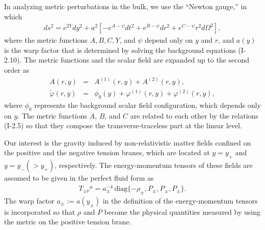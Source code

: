 \documentclass[a4paper,showpacs,preprintnumbers,amsmath,amssymb]{revtex4}
\begin{document}
In analyzing metric perturbations in the bulk, we use the ``Newton gauge,'' in which   
\begin{eqnarray}
 ds^2 
     = e^{2 Y } dy^2 + a^2 
\left[- e^{ A - \psi } dt^2
      + e^{ B - \psi } dr^2
      + e^{ C - \psi } r^2 d\Omega^2 
\right], 
\label{eq:metric}
\end{eqnarray}
where the metric functions $A, B, C, Y$, and $\psi$ depend only on $y$ and $r$, and $a(y)$ is the warp factor that is determined by solving the background equations (I-2.10).
The metric functions and the scalar field are expanded up to the second order as 
\begin{eqnarray}
  A(r,y) &=& A^{(1)}(r,y) +A^{(2)} (r,y) ,
\\
 \tilde\varphi (r, y) 
 &=& \phi_0(y) + \varphi^{(1)}(r,y)+\varphi^{(2)}(r,y) ,
\end{eqnarray}
where $\phi_0$ represents the background scalar field configuration, which depends only on $y$. The metric functions $A$, $B$, and $C$ are related to each other by the relations (I-2.5) so that they compose the transverse-traceless part at the linear level. 


Our interest is the gravity induced by non-relativistic matter fields confined on the positive and the negative tension branes, which are located at $y=y_+$ and $y=y_- (> y_+)$, respectively. 
The energy-momentum tensors of these fields are assumed to be given in the perfect fluid form as
\begin{eqnarray}
    T_{{\pm} \nu }{}^{\!\mu} = 
    a_\pm^{-4} \,
    {\mathrm{diag}} 
    \{- \rho_{\pm}, P_{\pm}, P_{\pm}, P_{\pm} \}.
\label{eq:EM tensor}
\end{eqnarray}
The warp factor $a_\pm:=a(y_\pm)$ in the definition of the energy-momentum tensors is incorporated so that $\rho$ and $P$ become the physical quantities measured by using the metric on the positive tension brane.  
\end{document}
